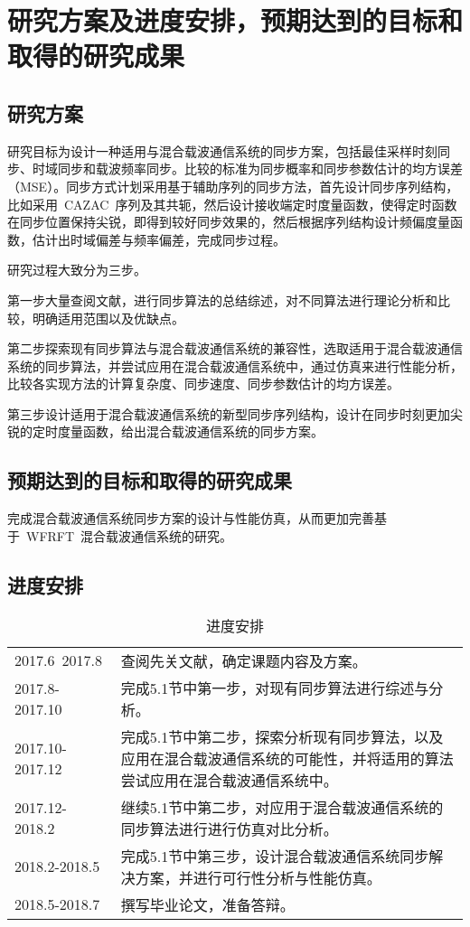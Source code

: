 
\section{研究方案及进度安排，预期达到的目标和取得的研究成果}
\subsection{研究方案}
研究目标为设计一种适用与混合载波通信系统的同步方案，包括最佳采样时刻同步、时域同步和载波频率同步。比较的标准为同步概率和同步参数估计的均方误差（MSE）。同步方式计划采用基于辅助序列的同步方法，首先设计同步序列结构，比如采用~CAZAC~序列及其共轭，然后设计接收端定时度量函数，使得定时函数在同步位置保持尖锐，即得到较好同步效果的，然后根据序列结构设计频偏度量函数，估计出时域偏差与频率偏差，完成同步过程。

研究过程大致分为三步。

第一步大量查阅文献，进行同步算法的总结综述，对不同算法进行理论分析和比较，明确适用范围以及优缺点。

第二步探索现有同步算法与混合载波通信系统的兼容性，选取适用于混合载波通信系统的同步算法，并尝试应用在混合载波通信系统中，通过仿真来进行性能分析，比较各实现方法的计算复杂度、同步速度、同步参数估计的均方误差。

第三步设计适用于混合载波通信系统的新型同步序列结构，设计在同步时刻更加尖锐的定时度量函数，给出混合载波通信系统的同步方案。

\subsection{预期达到的目标和取得的研究成果}
完成混合载波通信系统同步方案的设计与性能仿真，从而更加完善基于~WFRFT~混合载波通信系统的研究。

\subsection{进度安排}
\begin{table}[htbp]
\centering
\caption{进度安排}\label{table3}\vspace{-0.5em}
\begin{tabularx}{0.8\textwidth}{lX}
\toprule
2017.6~2017.8 & 查阅先关文献，确定课题内容及方案。\\
2017.8-2017.10 & 完成5.1节中第一步，对现有同步算法进行综述与分析。\\
2017.10-2017.12	& 完成5.1节中第二步，探索分析现有同步算法，以及应用在混合载波通信系统的可能性，并将适用的算法尝试应用在混合载波通信系统中。\\
2017.12-2018.2 & 继续5.1节中第二步，对应用于混合载波通信系统的同步算法进行进行仿真对比分析。\\
2018.2-2018.5 & 完成5.1节中第三步，设计混合载波通信系统同步解决方案，并进行可行性分析与性能仿真。\\
2018.5-2018.7 & 撰写毕业论文，准备答辩。\\
\bottomrule
\end{tabularx}
\end{table}


